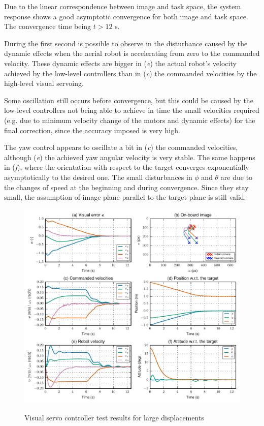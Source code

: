 %

Due to the linear correspondence between image and task space, the system response shows a good asymptotic convergence for both image and task space. The convergence time being $t > 12$ s.

During the first second is possible to observe in the disturbance caused by the dynamic effects when the aerial robot is accelerating from zero to the commanded velocity. These dynamic effects are bigger in (\emph{e}) the actual robot's velocity achieved by the low-level controllers than in (\emph{c}) the commanded velocities by the high-level visual servoing.

Some oscillation still occurs before convergence, but this could be caused by the low-level controllers not being able to achieve in time the small velocities required (e.g. due to minimum velocity change of the motors and dynamic effects) for the final correction, since the accuracy imposed is very high.

The yaw control appears to oscillate a bit in (\emph{c}) the commanded velocities, although (\emph{e}) the achieved yaw angular velocity is very stable. The same happens in (\emph{f}), where the orientation with respect to the target converges exponentially asymptotically to the desired one. The small disturbances in $\phi$ and $\theta$ are due to the changes of speed at the beginning and during convergence. Since they stay small, the assumption of image plane parallel to the target plane is still valid.

\begin{figure}[!htb]
	\caption{Visual servo controller test results for large displacements}
	\centering
	\includegraphics[width=\textwidth]{content/chapter_06/images/exp_015_plot.pdf}
	\label{fig:large-displacements}
\end{figure}

